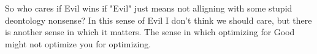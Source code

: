 \\\\
So who cares if Evil wins if "Evil" just means not alligning with some stupid deontology nonsense? In this sense of Evil I don't think we should care, but there is another sense in which it matters. The sense in which optimizing for Good might not optimize you for optimizing.



